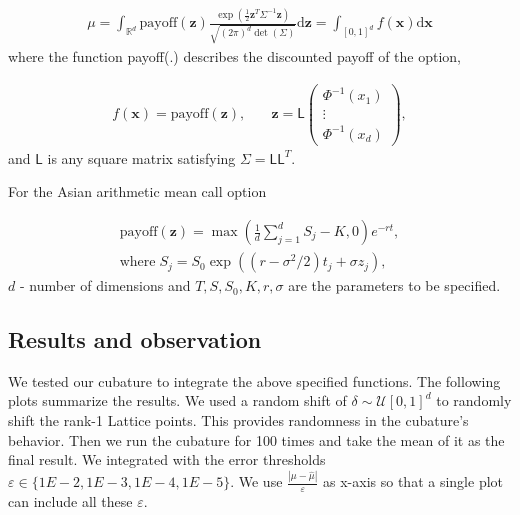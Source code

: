 \documentclass[twocolumn]{svjour3}          %
\newcommand{\bm}[1]{\boldsymbol{#1}}
\newcommand{\mSigma}{\Sigma}
\newcommand{\dif}[1]{\text{d}{#1}}
\newcommand{\reals}{\mathbb{R}}
\newcommand{\vx}{\bm{x}}
\newcommand{\dvx}{\dif{\bm{x}}}
\newcommand{\vz}{\bm{z}}
\newcommand{\dvz}{\dif{\bm{z}}}
\newcommand{\mL}{\mathsf{L}}
\newcommand{\hmu}{\widehat{\mu}}
\def\abs#1{\ensuremath{\left \lvert #1 \right \rvert}}
\begin{document}
\begin{enumerate}
\begin{align*}
\mu = \int_{\reals^d} \text{payoff}(\vz) \frac{\exp(\frac 12 \vz^T\mSigma^{-1}\vz)}{\sqrt{(2\pi)^d \det(\mSigma)}} \dvz = \int_{[0,1]^d} f(\vx) \dvx
\end{align*}
where the function payoff(.) describes the discounted payoff of the option,


\begin{align*}
f(\vx) = \text{payoff}(\vz), & \quad \vz = \mL 
\begin{pmatrix}
\Phi^{-1}(x_1) \\ \vdots \\ \Phi^{-1}(x_d)
\end{pmatrix},
\end{align*}
and $\mL$ is any square matrix satisfying $\mSigma = \mL \mL^T$.

For the Asian arithmetic mean call option

\begin{multline*}
\text{payoff}(\vz) = \max\left( \frac 1d  \sum_{j=1}^d S_j - K, 0 \right) e^{-r t}, \\ \text{where} \;
S_j = S_0 \exp((r-\sigma^2/2)t_j + \sigma z_j ),
\end{multline*}
$d$ - number of dimensions and $T, S, S_0, K, r, \sigma$ are the parameters to be specified.


\end{enumerate}














\subsection{Results and observation}

We tested our cubature to integrate the above specified functions. The following plots summarize the results. We used a random shift of $\delta \sim \mathcal{U}[0,1]^d$ to randomly shift the rank-1 Lattice points. This provides randomness in the cubature's behavior. Then we run the cubature for 100 times and take the mean of it as the final result. We integrated with the error thresholds $\varepsilon \in \{1E-2, 1E-3, 1E-4, 1E-5\}$. We use $\frac{\abs{\mu - \hmu}}{\varepsilon}$ as x-axis so that a single plot can include all these $\varepsilon$.
\end{document}
